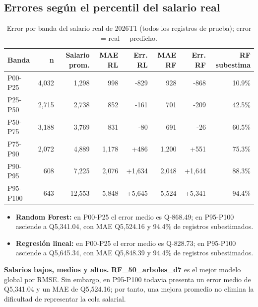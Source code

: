 \subsection{Errores según el percentil del salario real}
\begin{table}[htbp]\centering\footnotesize
\begin{tabular}{lrrrrrrr}\toprule
Banda & n & Salario prom. & MAE RL & Err. RL & MAE RF & Err. RF & RF subestima \\ \midrule
P00-P25 & 4,032 & 1,298 & 998 & -829 & 928 & -868 & 10.9\% \\
P25-P50 & 2,715 & 2,738 & 852 & -161 & 701 & -209 & 42.5\% \\
P50-P75 & 3,188 & 3,769 & 831 & -80 & 691 & -26 & 60.5\% \\
P75-P90 & 2,072 & 4,889 & 1,178 & +486 & 1,200 & +551 & 75.3\% \\
P90-P95 & 608 & 7,225 & 2,076 & +1,634 & 2,048 & +1,644 & 88.3\% \\
P95-P100 & 643 & 12,553 & 5,848 & +5,645 & 5,524 & +5,341 & 94.4\% \\
\bottomrule\end{tabular}
\caption{Error por banda del salario real de 2026T1 (todos los registros de prueba); error = real $-$ predicho.}
\end{table}
\begin{itemize}\setlength{\itemsep}{2pt}
\item \textbf{Random Forest:} en P00-P25 el error medio es Q-868.49; en P95-P100 asciende a Q5,341.04, con MAE Q5,524.16 y 94.4\% de registros subestimados.
\item \textbf{Regresión lineal:} en P00-P25 el error medio es Q-828.73; en P95-P100 asciende a Q5,645.34, con MAE Q5,848.39 y 94.4\% de registros subestimados.
\end{itemize}

\textbf{Salarios bajos, medios y altos.} \textbf{RF\_50\_arboles\_d7} es el mejor modelo global por RMSE. Sin embargo, en P95-P100 todavia presenta un error medio de Q5,341.04 y un MAE de Q5,524.16; por tanto, una mejora promedio no elimina la dificultad de representar la cola salarial.

